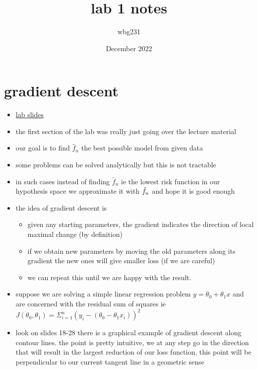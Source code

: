 \documentclass{article}
\title{lab 1 notes}
\author{wbg231 }
\date{December 2022}
\begin{document}
\maketitle

\section{gradient descent}
\begin{itemize}
\item \href{https://nyu-ds1003.github.io/mlcourse/2023/labs/Lab1.pdf}{lab slides}
\item the first section of the lab was really just going over the lecture material 
\item our goal is to find $\hat{f}_{n}$ the best possible model from given data 
\item some problems can be solved analytically but this is not tractable
\item in such cases instead of finding $\hat{f}_{n}$ ie the lowest risk function in our hypothesis space we approximate it with  $\Tilde{f}_{n}$ and hope it is good enough
\item the idea of gradient descent is 
\begin{itemize}
    \item given any starting parameters, the gradient indicates the direction of local maximal change (by definition)
    \item if we obtain new parameters by moving the old parameters along its gradient the new ones will give smaller loss (if we are careful)
    \item we can repeat this until we are happy with the result. 
\end{itemize}
\item suppose we are solving a simple linear regression problem $y=\theta_{0}+\theta_{1}x$ and are concerned with the residual sum of squares ie $J(\theta_{0},\theta_{1})=\Sigma_{i=1}^{n}(y_i-(\theta_{0}-\theta_{1}x_i))^2$
\item look on slides 18-28 there is a graphical example of gradient descent along contour lines. the point is pretty intuitive, we at any step go in the direction that will result in the largest reduction of our loss function, this point will be perpendicular to our current tangent line in a geometric sense 


\end{itemize}
\end{document}
